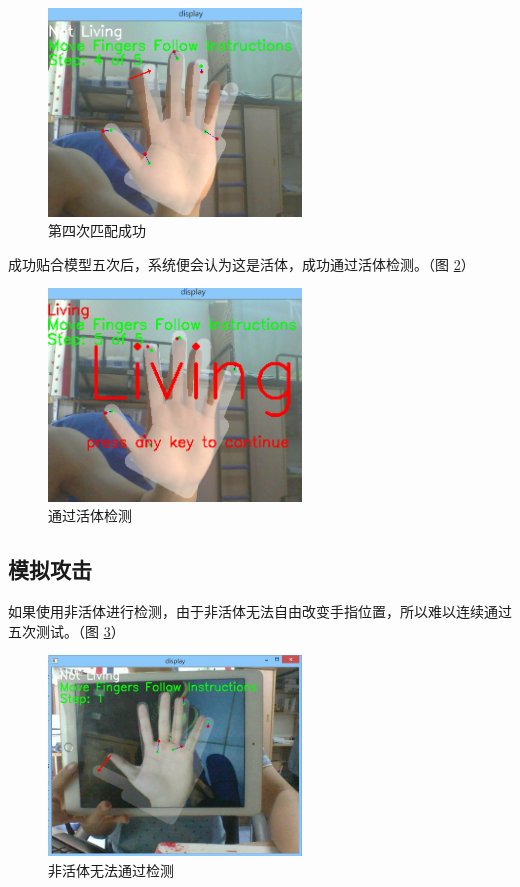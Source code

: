 \documentclass[UTF8, a4paper, fontset=none]{article}
\begin{document}
	\begin{figure}
    \centering
    \includegraphics[width=0.6\textwidth]{./test2.png}
    \caption{第四次匹配成功}
    \label{match2}
	\end{figure}
	
	成功贴合模型五次后，系统便会认为这是活体，成功通过活体检测。（图 \ref{match3}）
	
	\begin{figure}
    \centering
    \includegraphics[width=0.6\textwidth]{./finish.png}
    \caption{通过活体检测}
    \label{match3}
	\end{figure}

    \subsection{模拟攻击}
	
	如果使用非活体进行检测，由于非活体无法自由改变手指位置，所以难以连续通过五次测试。（图 \ref{match4}）
	
	\begin{figure}
    \centering
    \includegraphics[width=0.6\textwidth]{./fault.jpg}
    \caption{非活体无法通过检测}
    \label{match4}
	\end{figure}
\end{document}

